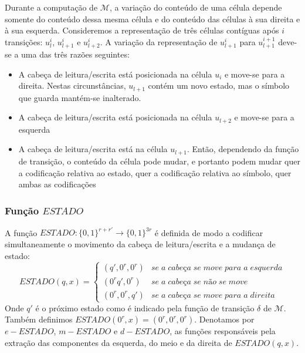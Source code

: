 \documentclass[10pt,a4paper]{report}
\begin{document}
Durante a computação de $\mathcal{M}$, a variação do conteúdo de uma célula depende somente do conteúdo dessa mesma célula e do conteúdo das células à sua direita e à sua esquerda. Consideremos a representação de três células contíguas após $i$ transições: $u^i_l$, $u^i_{l+1}$ e $u^i_{l+2}$. A variação da representação de $u^i_{l+1}$ para $u^{i+1}_{l+1}$ deve-se a uma das três razões seguintes:
\begin{itemize}
\item A cabeça de leitura/escrita está posicionada na célula $u_i$ e move-se para a direita. Nestas circunstâncias, $u_{l+1}$ contém um novo estado, mas o símbolo que guarda mantém-se inalterado.
\item A cabeça de leitura/escrita está posicionada na célula $u_{l+2}$ e move-se para a esquerda
\item A cabeça de leitura/escrita está na célula $u_{l+1}$. Então, dependendo da função de transição, o conteúdo da célula pode mudar, e portanto podem mudar quer a codificação relativa ao estado, quer a codificação relativa ao símbolo, quer ambas as codificações
\end{itemize}
\subsubsection{Função $ESTADO$}
A função $ESTADO: \{0,1\}^{r+r'} \rightarrow \{0,1\}^{3r}$ é definida de modo a codificar simultaneamente o movimento da cabeça de leitura/escrita e a mudança de estado:
\[ 
ESTADO(q,x) = \left\{
\begin{array}{ll}
      (q',0^r,0^r) &se \; a \; cabeça \; se \; move \; para \; a \; esquerda\\
      (0^r q',0^r) &se \; a \; cabeça \; se \; não \; se \; move\\
      (0^r,0^r,q') &se \; a \; cabeça \; se \; move \; para \; a \; direita
\end{array} 
\right. 
\]
Onde $q'$ é o próximo estado como é indicado pela função de transição $\delta$ de $\mathcal{M}$. Também definimos $ESTADO(0^r, x) = (0^r, 0^r, 0^r)$. Denotamos por $e-ESTADO$, $m-ESTADO$ e $d-ESTADO$, as funções responsáveis pela extração das componentes da esquerda, do meio e da direita de $ESTADO(q, x)$.
\end{document}
